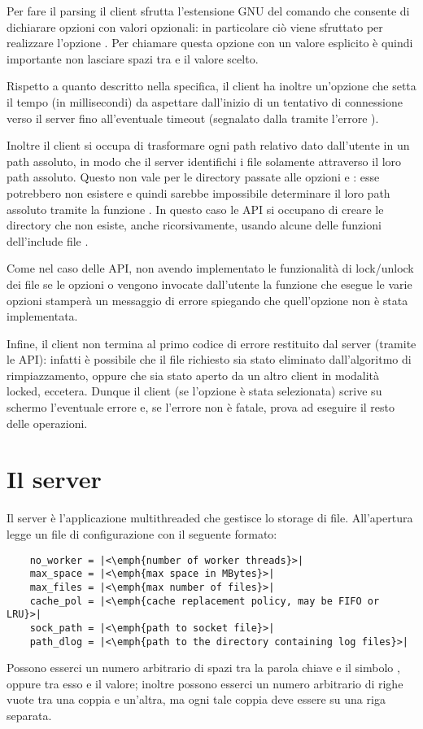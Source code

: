 \documentclass[11pt,oneface]{article}
\begin{document}
Per fare il parsing il client sfrutta l'estensione GNU del comando  che consente di dichiarare opzioni con valori opzionali: in particolare ciò viene sfruttato per realizzare l'opzione . Per chiamare questa opzione con un valore esplicito è quindi importante non lasciare spazi tra  e il valore scelto.

Rispetto a quanto descritto nella specifica, il client ha inoltre un'opzione  che setta il tempo (in millisecondi) da aspettare dall'inizio di un tentativo di connessione verso il server fino all'eventuale timeout (segnalato dalla  tramite l'errore ).

Inoltre il client si occupa di trasformare ogni path relativo dato dall'utente in un path assoluto, in modo che il server identifichi i file solamente attraverso il loro path assoluto. Questo non vale per le directory passate alle opzioni  e : esse potrebbero non esistere e quindi sarebbe impossibile determinare il loro path assoluto tramite la funzione . In questo caso le API si occupano di creare le directory che non esiste, anche ricorsivamente, usando alcune delle funzioni dell'include file .

Come nel caso delle API, non avendo implementato le funzionalità di lock/unlock dei file se le opzioni  o  vengono invocate dall'utente la funzione che esegue le varie opzioni stamperà un messaggio di errore spiegando che quell'opzione non è stata implementata.

Infine, il client non termina al primo codice di errore restituito dal server (tramite le API): infatti è possibile che il file richiesto sia stato eliminato dall'algoritmo di rimpiazzamento, oppure che sia stato aperto da un altro client in modalità locked, eccetera. Dunque il client (se l'opzione  è stata selezionata) scrive su schermo l'eventuale errore e, se l'errore non è fatale, prova ad eseguire il resto delle operazioni.

\section{Il server}

Il server è l'applicazione multithreaded che gestisce lo storage di file. All'apertura legge un file di configurazione con il seguente formato:
\begin{verbatim}
    no_worker = |<\emph{number of worker threads}>|
    max_space = |<\emph{max space in MBytes}>|
    max_files = |<\emph{max number of files}>|
    cache_pol = |<\emph{cache replacement policy, may be FIFO or LRU}>|
    sock_path = |<\emph{path to socket file}>|
    path_dlog = |<\emph{path to the directory containing log files}>|
\end{verbatim}
Possono esserci un numero arbitrario di spazi tra la parola chiave e il simbolo \shell{=}, oppure tra esso e il valore; inoltre possono esserci un numero arbitrario di righe vuote tra una coppia  e un'altra, ma ogni tale coppia deve essere su una riga separata.
\end{document}
